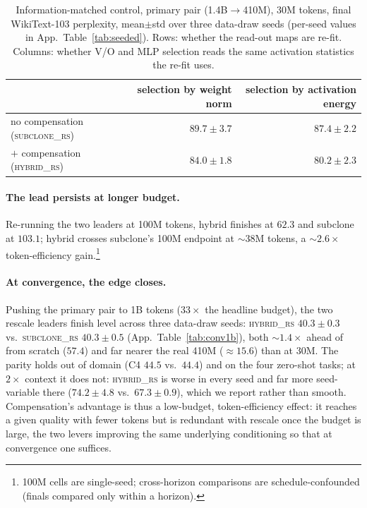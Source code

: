 \begin{table}[!htb]
\centering
\footnotesize
\caption{Information-matched control, primary pair (1.4B$\to$410M), 30M tokens,
final WikiText-103 perplexity, mean$\pm$std over three data-draw seeds (per-seed
values in App.~Table~\ref{tab:seeded}). Rows: whether the read-out maps are
re-fit. Columns: whether V/O and MLP selection reads the same activation
statistics the re-fit uses.}
\label{tab:actsel}
\begin{tabular}{lrr}
\toprule
 & selection by weight norm & selection by activation energy \\
\midrule
no compensation (\textsc{subclone\_rs})   & $89.7\pm3.7$ & $87.4\pm2.2$ \\
$+$ compensation (\textsc{hybrid\_rs})    & $84.0\pm1.8$ & $\mathbf{80.2\pm2.3}$ \\
\bottomrule
\end{tabular}
\end{table}

\paragraph{The lead persists at longer budget.}
Re-running the two leaders at 100M tokens, hybrid finishes at $62.3$ and
subclone at $103.1$; hybrid crosses subclone's 100M endpoint at
$\sim$38M tokens, a $\sim$$2.6\times$ token-efficiency gain.\footnote{100M cells
are single-seed; cross-horizon comparisons are schedule-confounded (finals
compared only within a horizon).}

\paragraph{At convergence, the edge closes.}
Pushing the primary pair to 1B tokens ($33\times$ the headline budget), the two
rescale leaders finish level across three data-draw seeds: \textsc{hybrid\_rs}
$40.3\pm0.3$ vs.\ \textsc{subclone\_rs} $40.3\pm0.5$
(App.~Table~\ref{tab:conv1b}), both $\sim$$1.4\times$ ahead of from scratch
($57.4$) and far nearer the real 410M ($\approx15.6$) than at 30M. The parity
holds out of domain (C4 $44.5$ vs.\ $44.4$) and on the four zero-shot tasks; at
$2\times$ context it does not: \textsc{hybrid\_rs} is worse in every seed and
far more seed-variable there ($74.2\pm4.8$ vs.\ $67.3\pm0.9$), which we report
rather than smooth. Compensation's
advantage is thus a low-budget, token-efficiency effect: it reaches a given
quality with fewer tokens but is redundant with rescale once the budget is large,
the two levers improving the same underlying conditioning so that at convergence
one suffices.

